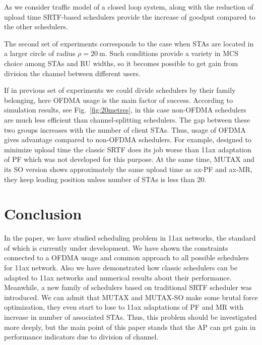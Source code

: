 As we consider traffic model of a closed loop system, along with the reduction of upload time SRTF-based schedulers provide the increase of goodput compared to the other schedulers.

The second set of experiments corresponds to the case when STAs are located in a larger circle of radius $\rho = \SI{20}{\m}$.
Such conditions provide a variety in MCS choice among STAs and RU widths, so it becomes possible to get gain from division the channel between different users.

If in previous set of experiments we could divide schedulers by their family belonging, here OFDMA usage is the main factor of success.
According to simulation results, see Fig.~\ref{fig:20metres}, in this case non-OFDMA schedulers are  much less efficient than channel-splitting schedulers. 
The gap between these two groups increases with the number of client STAs. 
Thus, usage of OFDMA gives advantage compared to non-OFDMA schedulers. 
\textcolor{prpl}{For example, designed to minimize upload time the classic SRTF does its job worse than 11ax adaptation of PF which was not developed for this purpose.}
At the same time, MUTAX and its SO version shows approximately the same upload time as ax-PF and ax-MR, they keep leading position unless number of STAs is less than 20.  

\section{Conclusion}
\label{sec:conclusion}

In the paper, we have studied scheduling problem in 11ax networks, the standard of which is currently under development. We have shown the constraints connected to a OFDMA usage and common approach to all possible schedulers for 11ax network.
Also we have demonstrated how classic schedulers can be adapted to 11ax networks and numerical results about their performance. 
Meanwhile, a new family of schedulers based on traditional SRTF scheduler was introduced. 
We can admit that MUTAX and MUTAX-SO make some brutal force optimization, they even start to lose to 11ax adaptations of PF and MR with increase in number of associated STAs. 
Thus, this problem should be investigated more deeply, but the main point of this paper stands that the AP can get gain in performance indicators due to division of channel.


 

